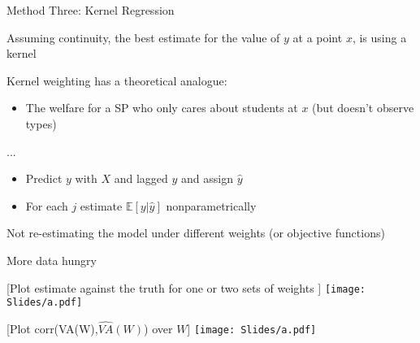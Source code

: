 \documentclass[t,aspectratio=169,11pt]{beamer}
\newenvironment{wideitemize}{\itemize\addtolength{\itemsep}{14pt}}{\enditemize}
\begin{document}
\begin{frame}{Method Three: Kernel Regression}

\begin{wideitemize}

    \item Assuming continuity, the best estimate for the value of $y$ at a point $x$,  is using a kernel
    \item Kernel weighting has a theoretical analogue: 
    \begin{itemize}
        \item The welfare for a SP who only cares about students at $x$ (but doesn't observe types)
    \end{itemize}
 
    
    \item ... \citep{}
    \begin{itemize}
        \item Predict $y$ with $X$ and lagged $y$ and assign $\hat{y}$
        \item For each $j$ estimate $\mathbb{E}[y|\hat{y}]$ nonparametrically
    \end{itemize}

    \item Not re-estimating the model under different weights (or objective functions)
    \item More data hungry \color{gray}{(when to talk about heterogeneity vs changes over time?)
    \item Bandwidth selection...? (Also a place to talk about measuring scores in pctle vs $\sigma$?)}

\end{wideitemize}
\end{frame}

\begin{frame}{[Plot estimate against the truth for one or two sets of weights ]} 
\centering
{}
\texttt{[image: Slides/a.pdf]}

\end{frame}

\begin{frame}{[Plot corr(VA(W),$\hat{VA}(W)$) over $W$]} 
\centering
{}
\texttt{[image: Slides/a.pdf]}

\end{frame}
\end{document}
